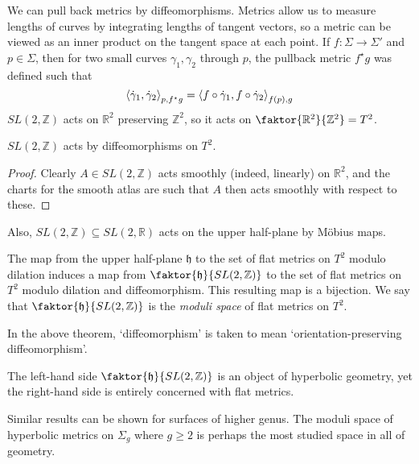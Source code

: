 We can pull back metrics by diffeomorphisms.
Metrics allow us to measure lengths of curves by integrating lengths of tangent vectors, so a metric can be viewed as an inner product on the tangent space at each point.
If \( f \colon \Sigma \to \Sigma' \) and \( p \in \Sigma \), then for two small curves \( \gamma_1, \gamma_2 \) through \( p \), the pullback metric \( f^\star g \) was defined such that
\[
	\left\langle{\dot \gamma_1, \dot \gamma_2}\right\rangle_{p, f^\star g} = \left\langle{f \circ \dot \gamma_1, f \circ \dot \gamma_2}\right\rangle_{f(p), g}
\]
\( SL(2,\mathbb Z) \) acts on \( \mathbb R^2 \) preserving \( \mathbb Z^2 \), so it acts on \( \faktor{\mathbb R^2}{\mathbb Z^2} = T^2 \).
\begin{lemma}
	\( SL(2,\mathbb Z) \) acts by diffeomorphisms on \( T^2 \).
\end{lemma}
\begin{proof}
	Clearly \( A \in SL(2,\mathbb Z) \) acts smoothly (indeed, linearly) on \( \mathbb R^2 \), and the charts for the smooth atlas are such that \( A \) then acts smoothly with respect to these.
\end{proof}
Also, \( SL(2,\mathbb Z) \subseteq SL(2,\mathbb R) \) acts on the upper half-plane by M\"obius maps.
\begin{theorem}
	The map from the upper half-plane \( \mathfrak{h} \) to the set of flat metrics on \( T^2 \) modulo dilation induces a map from \( \faktor{\mathfrak{h}}{SL(2,\mathbb Z)} \) to the set of flat metrics on \( T^2 \) modulo dilation and diffeomorphism.
	This resulting map is a bijection.
	We say that \( \faktor{\mathfrak{h}}{SL(2,\mathbb Z)} \) is the \textit{moduli space} of flat metrics on \( T^2 \).
\end{theorem}
In the above theorem, `diffeomorphism' is taken to mean `orientation-preserving diffeomorphism'.
\begin{remark}
	The left-hand side \( \faktor{\mathfrak{h}}{SL(2,\mathbb Z)} \) is an object of hyperbolic geometry, yet the right-hand side is entirely concerned with flat metrics.

	Similar results can be shown for surfaces of higher genus.
	The moduli space of hyperbolic metrics on \( \Sigma_g \) where \( g \geq 2 \) is perhaps the most studied space in all of geometry.
\end{remark}

